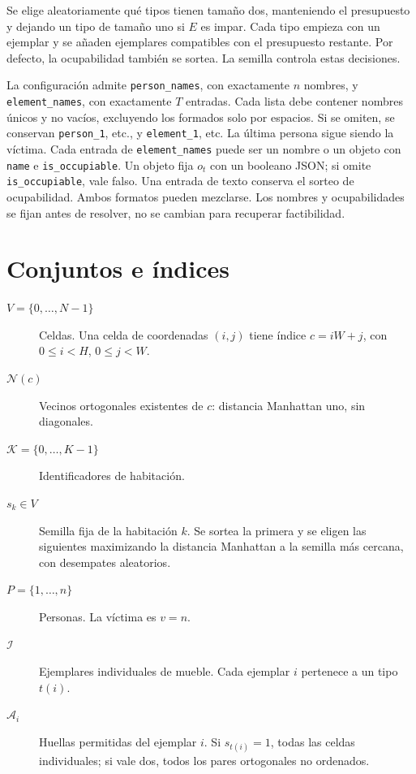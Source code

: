 \documentclass[11pt,a4paper]{article}
\begin{document}
Se elige aleatoriamente qu\'e tipos tienen tama\~no dos, manteniendo
el presupuesto y dejando un tipo de tama\~no uno si $E$ es impar.
Cada tipo empieza con un ejemplar y se a\~naden ejemplares compatibles
con el presupuesto restante. Por defecto, la ocupabilidad tambi\'en
se sortea. La semilla controla estas decisiones.

La configuraci\'on admite \texttt{person\_names}, con exactamente
$n$ nombres, y \texttt{element\_names}, con exactamente $T$ entradas.
Cada lista debe contener nombres \'unicos y no vac\'ios, excluyendo
los formados solo por espacios. Si se omiten, se conservan
\texttt{person\_1}, etc., y \texttt{element\_1}, etc.
La \'ultima persona sigue siendo la v\'ictima.
Cada entrada de \texttt{element\_names} puede ser un nombre o un objeto
con \texttt{name} e \texttt{is\_occupiable}. Un objeto fija $o_t$
con un booleano JSON; si omite \texttt{is\_occupiable}, vale falso.
Una entrada de texto conserva el sorteo de ocupabilidad. Ambos
formatos pueden mezclarse. Los nombres y ocupabilidades se fijan
antes de resolver, no se cambian para recuperar factibilidad.

\section{Conjuntos e \'indices}

\begin{description}
  \item[$V=\{0,\ldots,N-1\}$] Celdas. Una celda de coordenadas $(i,j)$
        tiene \'indice $c=iW+j$, con $0\leq i<H$, $0\leq j<W$.
  \item[$\mathcal N(c)$] Vecinos ortogonales existentes de $c$:
        distancia Manhattan uno, sin diagonales.
  \item[$\mathcal K=\{0,\ldots,K-1\}$] Identificadores de habitaci\'on.
  \item[$s_k\in V$] Semilla fija de la habitaci\'on $k$. Se sortea la
        primera y se eligen las siguientes maximizando la distancia
        Manhattan a la semilla m\'as cercana, con desempates aleatorios.
  \item[$P=\{1,\ldots,n\}$] Personas. La v\'ictima es $v=n$.
  \item[$\mathcal I$] Ejemplares individuales de mueble. Cada ejemplar
        $i$ pertenece a un tipo $t(i)$.
  \item[$\mathcal A_i$] Huellas permitidas del ejemplar $i$. Si
        $s_{t(i)}=1$, todas las celdas individuales; si vale dos,
        todos los pares ortogonales no ordenados.
\end{description}
\end{document}

